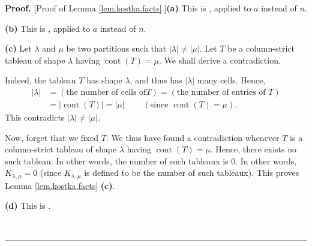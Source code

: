\documentclass[numbers=enddot,12pt,final,onecolumn,notitlepage]{scrartcl}%
\theoremstyle{definition}
\newenvironment{proof}[1][Proof]{\noindent\textbf{#1.} }{\ \rule{0.5em}{0.5em}}
\begin{document}
\begin{proof}
[Proof of Lemma \ref{lem.kostka.facts}.]\textbf{(a)} This is \cite[Exercise
2.2.13(d)]{GriRei18}, applied to $a$ instead of $n$.

\textbf{(b)} This is \cite[Exercise 2.2.13(e)]{GriRei18}, applied to $a$
instead of $n$.

\textbf{(c)} Let $\lambda$ and $\mu$ be two partitions such that $\left\vert
\lambda\right\vert \neq\left\vert \mu\right\vert $. Let $T$ be a column-strict
tableau of shape $\lambda$ having $\operatorname*{cont}\left(  T\right)  =\mu
$. We shall derive a contradiction.

Indeed, the tableau $T$ has shape $\lambda$, and thus has $\left\vert
\lambda\right\vert $ many cells. Hence,%
\begin{align*}
\left\vert \lambda\right\vert  &  =\left(  \text{the number of cells of
}T\right)  =\left(  \text{the number of entries of }T\right) \\
&  =\left\vert \operatorname*{cont}\left(  T\right)  \right\vert =\left\vert
\mu\right\vert \ \ \ \ \ \ \ \ \ \ \left(  \text{since }\operatorname*{cont}%
\left(  T\right)  =\mu\right)  .
\end{align*}
This contradicts $\left\vert \lambda\right\vert \neq\left\vert \mu\right\vert
$.

Now, forget that we fixed $T$. We thus have found a contradiction whenever $T$
is a column-strict tableau of shape $\lambda$ having $\operatorname*{cont}%
\left(  T\right)  =\mu$. Hence, there exists no such tableau. In other words,
the number of such tableaux is $0$. In other words, $K_{\lambda,\mu}=0$ (since
$K_{\lambda,\mu}$ is defined to be the number of such tableaux). This proves
Lemma \ref{lem.kostka.facts} \textbf{(c)}.

\textbf{(d)} This is \cite[Exercise 2.7.10(a)]{GriRei18}.


\end{proof}
\end{document}
